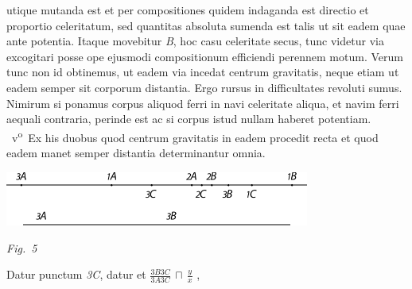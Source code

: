 %
 utique mutanda est
et per compositiones quidem indaganda 
%
est directio\protect{}
%
et proportio celeritatum\protect{}, sed
quantitas absoluta\protect{} sumenda est talis ut sit eadem quae ante potentia\protect{}. Itaque movebitur
\textit{B}, hoc casu celeritate 
%
%
secus, tunc videtur
via excogitari posse ope ejusmodi compositionum efficiendi perennem motum\protect{}. Verum
tunc non id obtinemus, ut eadem via incedat centrum gravitatis\protect{}, neque etiam ut eadem semper
sit corporum distantia\protect{}. Ergo rursus in difficultates revoluti sumus. Nimirum si ponamus
corpus aliquod ferri in navi\protect{} celeritate aliqua, et navim\protect{} ferri aequali contraria\protect{}, perinde est ac
si corpus istud nullam haberet potentiam\protect{}.
\pend
\pstart
{}~v\textsuperscript{o}\rbrack\
Ex his duobus quod centrum gravitatis\protect{} in eadem procedit recta
et quod eadem manet semper
distantia\protect{} determinantur omnia.
\pend
\vspace{2.0em}
  \centerline{\includegraphics[width=0.75\textwidth]{gesamttex/edit_VIII,3/images/LH_37_05_148-149_d5_148v.pdf}} 
    \vspace{0.5em}
\centerline{\lbrack\textit{Fig.~5}\rbrack}
  \vspace{1.5em}
 \pstart
Datur punctum \textit{{\scriptsize 3}C}, datur et
%
$\displaystyle\frac{{\scriptstyle \textit{3}}B{\scriptstyle \textit{3}}C}{{\scriptstyle \textit{3}}A{\scriptstyle \textit{3}}C}\, \sqcap\, \displaystyle\frac{y}{x}$ , 
